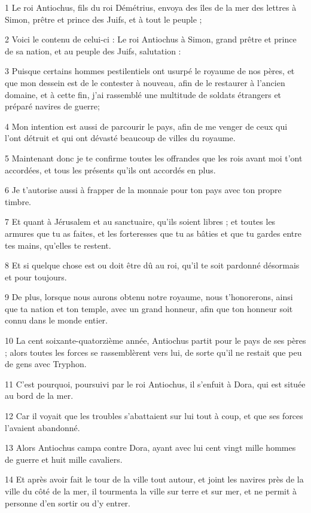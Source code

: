 \par 1 Le roi Antiochus, fils du roi Démétrius, envoya des îles de la mer des lettres à Simon, prêtre et prince des Juifs, et à tout le peuple ;
\par 2 Voici le contenu de celui-ci : Le roi Antiochus à Simon, grand prêtre et prince de sa nation, et au peuple des Juifs, salutation :
\par 3 Puisque certains hommes pestilentiels ont usurpé le royaume de nos pères, et que mon dessein est de le contester à nouveau, afin de le restaurer à l'ancien domaine, et à cette fin, j'ai rassemblé une multitude de soldats étrangers et préparé navires de guerre;
\par 4 Mon intention est aussi de parcourir le pays, afin de me venger de ceux qui l'ont détruit et qui ont dévasté beaucoup de villes du royaume.
\par 5 Maintenant donc je te confirme toutes les offrandes que les rois avant moi t'ont accordées, et tous les présents qu'ils ont accordés en plus.
\par 6 Je t'autorise aussi à frapper de la monnaie pour ton pays avec ton propre timbre.
\par 7 Et quant à Jérusalem et au sanctuaire, qu'ils soient libres ; et toutes les armures que tu as faites, et les forteresses que tu as bâties et que tu gardes entre tes mains, qu'elles te restent.
\par 8 Et si quelque chose est ou doit être dû au roi, qu'il te soit pardonné désormais et pour toujours.
\par 9 De plus, lorsque nous aurons obtenu notre royaume, nous t'honorerons, ainsi que ta nation et ton temple, avec un grand honneur, afin que ton honneur soit connu dans le monde entier.
\par 10 La cent soixante-quatorzième année, Antiochus partit pour le pays de ses pères ; alors toutes les forces se rassemblèrent vers lui, de sorte qu'il ne restait que peu de gens avec Tryphon.
\par 11 C'est pourquoi, poursuivi par le roi Antiochus, il s'enfuit à Dora, qui est située au bord de la mer.
\par 12 Car il voyait que les troubles s'abattaient sur lui tout à coup, et que ses forces l'avaient abandonné.
\par 13 Alors Antiochus campa contre Dora, ayant avec lui cent vingt mille hommes de guerre et huit mille cavaliers.
\par 14 Et après avoir fait le tour de la ville tout autour, et joint les navires près de la ville du côté de la mer, il tourmenta la ville sur terre et sur mer, et ne permit à personne d'en sortir ou d'y entrer.
